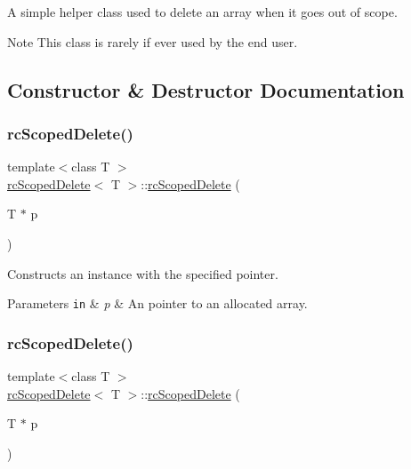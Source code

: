 A simple helper class used to delete an array when it goes out of scope. \begin{DoxyNote}{Note}
This class is rarely if ever used by the end user. 
\end{DoxyNote}


\subsection{Constructor \& Destructor Documentation}
\mbox{\label{classrcScopedDelete_a2f096ff87f4d48259dd85360a4218155}} 
\subsubsection{\texorpdfstring{rc\+Scoped\+Delete()}{rcScopedDelete()}\hspace{0.1cm}{\footnotesize\ttfamily [1/2]}}
{\footnotesize\ttfamily template$<$class T $>$ \\
\hyperlink{classrcScopedDelete}{rc\+Scoped\+Delete}$<$ T $>$\+::\hyperlink{classrcScopedDelete}{rc\+Scoped\+Delete} (\begin{DoxyParamCaption}\item[{T $\ast$}]{p }\end{DoxyParamCaption})\hspace{0.3cm}{\ttfamily [inline]}}

Constructs an instance with the specified pointer. 
\begin{DoxyParams}[1]{Parameters}
\mbox{\tt in}  & {\em p} & An pointer to an allocated array. \\
\hline
\end{DoxyParams}
\mbox{\label{classrcScopedDelete_a2f096ff87f4d48259dd85360a4218155}} 
\subsubsection{\texorpdfstring{rc\+Scoped\+Delete()}{rcScopedDelete()}\hspace{0.1cm}{\footnotesize\ttfamily [2/2]}}
{\footnotesize\ttfamily template$<$class T $>$ \\
\hyperlink{classrcScopedDelete}{rc\+Scoped\+Delete}$<$ T $>$\+::\hyperlink{classrcScopedDelete}{rc\+Scoped\+Delete} (\begin{DoxyParamCaption}\item[{T $\ast$}]{p }\end{DoxyParamCaption})\hspace{0.3cm}{\ttfamily [inline]}}

